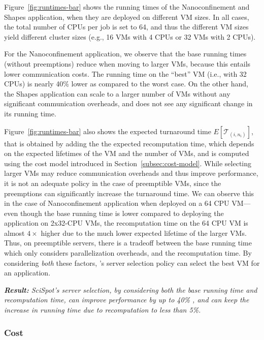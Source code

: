 Figure~\ref{fig:runtimes-bar} shows the running times of the Nanoconfinement and Shapes application, when they are deployed on different VM sizes.
In all cases, the total number of CPUs per job is set to 64, and thus the different VM sizes yield different cluster sizes (e.g., 16 VMs with 4 CPUs or 32 VMs with 2 CPUs).


For the Nanoconfinement application, we observe that the base running times (without preemptions) reduce when moving to larger VMs, because this entails lower communication costs.
The running time on the ``best'' VM (i.e., with 32 CPUs) is nearly 40\% lower as compared to the worst case. 
On the other hand, the Shapes application can scale to a larger number of VMs without any significant communication overheads, and does not see any significant change in its running time.

Figure~\ref{fig:runtimes-bar} also shows the expected turnaround time $E[\mathcal{T}_{(i,n_i)}]$, that is obtained by adding the the expected recomputation time, which depends on the expected lifetimes of the VM and the number of VMs, and is computed using the cost model introduced in Section~\ref{subsec:cost-model}. 
While selecting larger VMs may reduce communication overheads and thus improve performance, it is not an adequate policy in the case of preemptible VMs, since the preemptions can significantly increase the turnaround time.
We can observe this in the case of Nanoconfinement application when deployed on a 64 CPU VM---even though the base running time is lower compared to deploying the application on 2x32-CPU VMs, the recomputation time on the 64 CPU VM is almost $4\times$ higher due to the much lower expected lifetime of the larger VMs. 
Thus, on preemptible servers, there is a tradeoff between the base running time which only considers parallelization overheads, and the recomputation time.
By considering \emph{both} these factors, \sysname's server selection policy can select the best VM for an application. 


\noindent \emph{\textbf{Result:} SciSpot's server selection, by considering both the base running time and recomputation time, can improve performance by up to 40\% , and can keep the increase in running time due to recomputation to less than 5\%.}

\subsubsection{Cost}

